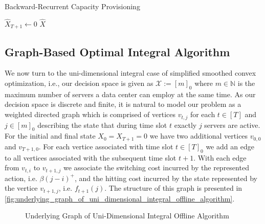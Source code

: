\begin{algorithm}
    \caption{Backward-Recurrent Capacity Provisioning \cite{Lin2011}}\label{alg:brcp}
    $\hat{X}_{T+1} \gets 0$\;
    \Return $\hat{X}$\;
\end{algorithm}

\subsection{Graph-Based Optimal Integral Algorithm}\label{section:offline_algorithms:ud:graph_based}

We now turn to the uni-dimensional integral case of simplified smoothed convex optimization, i.e., our decision space is given as $\mathcal{X} := [m]_0$ where $m \in \mathbb{N}$ is the maximum number of servers a data center can employ at the same time. As our decision space is discrete and finite, it is natural to model our problem as a weighted directed graph which is comprised of vertices $v_{t,j}$ for each $t \in [T]$ and $j \in [m]_0$ describing the state that during time slot $t$ exactly $j$ servers are active. For the initial and final state $X_0 = X_{T+1} = 0$ we have two additional vertices $v_{0,0}$ and $v_{T+1,0}$. For each vertice associated with time slot $t \in [T]_0$ we add an edge to all vertices associated with the subsequent time slot $t + 1$. With each edge from $v_{t,i}$ to $v_{t+1,j}$ we associate the switching cost incurred by the represented action, i.e. $\beta (j - i)^+$, and the hitting cost incurred by the state represented by the vertice $v_{t+1,j}$, i.e. $f_{t+1}(j)$. The structure of this graph is presented in \autoref{fig:underlying_graph_of_uni_dimensional_integral_offline_algorithm}.

\begin{figure}
    \centering
    [TODO]
    \caption{Underlying Graph of Uni-Dimensional Integral Offline Algorithm}
    \label{fig:underlying_graph_of_uni_dimensional_integral_offline_algorithm}
\end{figure}

